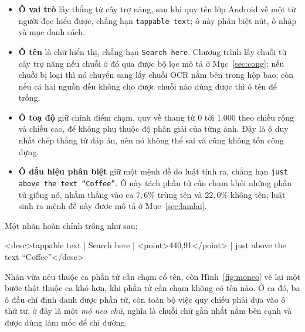 \documentclass[12pt,a4paper,onecolumn]{article}
\newcommand{\ôvuông}[2]{\tikz[baseline=-0.45ex]{\draw[#1,line width=0.9pt,#2] (0,0) rectangle (0.34,0.18);}}
\newcommand{\code}[1]{{\small\texttt{#1}}}
\begin{document}
\begin{itemize}[leftmargin=1.8em,itemsep=0.25em]
\item \textbf{Ô vai trò} lấy thẳng từ cây trợ năng, sau khi quy tên lớp Android về một từ
người đọc hiểu được, chẳng hạn \code{tappable text}; ô này phân biệt nút, ô nhập và mục
danh sách.
\item \textbf{Ô tên} là chữ hiển thị, chẳng hạn \code{Search here}. Chương trình lấy chuỗi từ cây trợ năng nếu
chuỗi ở đó qua được bộ lọc mô tả ở Mục~\ref{sec:cong}; nếu chuỗi bị loại thì nó chuyển sang
lấy chuỗi OCR nằm bên trong hộp bao; còn nếu cả hai nguồn đều không cho được chuỗi nào
dùng được thì ô tên để trống.
\item \textbf{Ô toạ độ} giữ chính điểm chạm, quy về thang từ $0$ tới $1.000$ theo chiều
rộng và chiều cao, để không phụ thuộc độ phân giải của từng ảnh. Đây là ô duy nhất chép thẳng từ đáp án, nên nó không thể sai và cũng không tốn công dựng.
\item \textbf{Ô dấu hiệu phân biệt} giữ một mệnh đề do luật tính ra, chẳng hạn \code{just
above the text “Coffee”}. Ô này tách phần tử cần chạm khỏi những phần tử giống nó, nhắm thẳng vào ca $7{,}6\%$ trùng
tên và $22{,}0\%$ không tên; luật sinh ra mệnh đề này được mô tả ở
Mục~\ref{sec:lamlai}.
\end{itemize}

Một nhãn hoàn chỉnh trông như sau:

\begin{center}\small\ttfamily
<desc>tappable text | Search here | <point>440,91</point> | just above the text
``Coffee''</desc>
\end{center}

Nhãn vừa nêu thuộc ca phần tử cần chạm có tên, còn Hình~\ref{fig:moneo} vẽ lại một bước
thật thuộc ca khó hơn, khi phần tử cần chạm không có tên nào. Ở ca đó, ba ô đầu chỉ định danh được phần tử, còn toàn bộ việc quy chiếu phải
dựa vào ô thứ tư, ở đây là một \emph{mỏ neo chữ}, nghĩa là chuỗi chữ gần nhất nằm bên cạnh và
được dùng làm mốc để chỉ đường.
\end{document}
